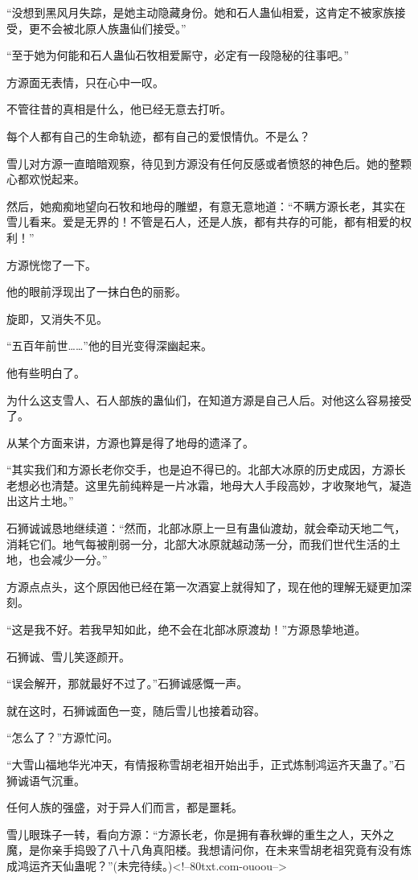\begin{this_body}
“没想到黑风月失踪，是她主动隐藏身份。她和石人蛊仙相爱，这肯定不被家族接受，更不会被北原人族蛊仙们接受。”

“至于她为何能和石人蛊仙石牧相爱厮守，必定有一段隐秘的往事吧。”

方源面无表情，只在心中一叹。

不管往昔的真相是什么，他已经无意去打听。

每个人都有自己的生命轨迹，都有自己的爱恨情仇。不是么？

雪儿对方源一直暗暗观察，待见到方源没有任何反感或者愤怒的神色后。她的整颗心都欢悦起来。

然后，她痴痴地望向石牧和地母的雕塑，有意无意地道：“不瞒方源长老，其实在雪儿看来。爱是无界的！不管是石人，还是人族，都有共存的可能，都有相爱的权利！”

方源恍惚了一下。

他的眼前浮现出了一抹白色的丽影。

旋即，又消失不见。

“五百年前世……”他的目光变得深幽起来。

他有些明白了。

为什么这支雪人、石人部族的蛊仙们，在知道方源是自己人后。对他这么容易接受了。

从某个方面来讲，方源也算是得了地母的遗泽了。

“其实我们和方源长老你交手，也是迫不得已的。北部大冰原的历史成因，方源长老想必也清楚。这里先前纯粹是一片冰霜，地母大人手段高妙，才收聚地气，凝造出这片土地。”

石狮诚诚恳地继续道：“然而，北部冰原上一旦有蛊仙渡劫，就会牵动天地二气，消耗它们。地气每被削弱一分，北部大冰原就越动荡一分，而我们世代生活的土地，也会减少一分。”

方源点点头，这个原因他已经在第一次酒宴上就得知了，现在他的理解无疑更加深刻。

“这是我不好。若我早知如此，绝不会在北部冰原渡劫！”方源恳挚地道。

石狮诚、雪儿笑逐颜开。

“误会解开，那就最好不过了。”石狮诚感慨一声。

就在这时，石狮诚面色一变，随后雪儿也接着动容。

“怎么了？”方源忙问。

“大雪山福地华光冲天，有情报称雪胡老祖开始出手，正式炼制鸿运齐天蛊了。”石狮诚语气沉重。

任何人族的强盛，对于异人们而言，都是噩耗。

雪儿眼珠子一转，看向方源：“方源长老，你是拥有春秋蝉的重生之人，天外之魔，是你亲手捣毁了八十八角真阳楼。我想请问你，在未来雪胡老祖究竟有没有炼成鸿运齐天仙蛊呢？”(未完待续。)<!--80txt.com-ouoou-->

\end{this_body}

